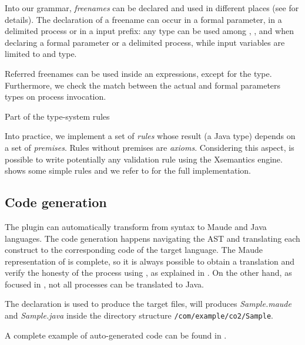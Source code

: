 Into our grammar, \textit{freenames} can be declared and used in different places (see  for details). The declaration of a freename can occur in a formal parameter, in a delimited process or in a input prefix: any type can be used among , ,  and  when declaring a formal parameter or a delimited process, while input variables are limited to  and  type.

Referred freenames can be used inside an expressions, except for the  type. Furthermore, we check the match between the actual and formal parameters types on process invocation.

\begin{listing}
	\caption{Part of the type-system rules}
	\label{lst:xsemantics-sample}
\end{listing}

Into practice, we implement a set of \textit{rules} whose result (a Java type) depends on a set of \textit{premises}. Rules without premises are \textit{axioms}. Considering this aspect, is possible to write potentially any validation rule using the Xsemantics engine.  shows some simple rules and we refer to  for the full implementation.


\subsection{Code generation}
The plugin can automatically transform from \coco syntax to Maude and Java languages.
The code generation happens navigating the AST and translating each \coco construct to the corresponding code of the target language. The Maude representation of \coco is complete, so it is always possible to obtain a translation and verify the honesty of the process using \cite{verifiable}, as explained in . On the other hand, as focused in , not all processes can be translated to Java.

The  declaration is used to produce the target files, \eg {}  will produces \textit{Sample.maude} and \textit{Sample.java} inside the directory structure \texttt{/com/example/co2/Sample}.

A complete example of auto-generated code can be found in .